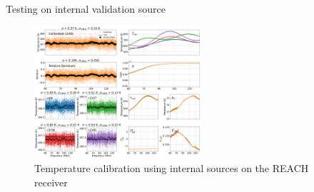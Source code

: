 \documentclass[aspectratio=169]{beamer}
\begin{document}
%

\begin{frame}{\small{Testing on internal validation source}}
    \begin{figure}
        \centering
        \includegraphics[width=0.55\textwidth]{images/temps.png}
        \caption{Temperature calibration using internal sources on the REACH 
        receiver}
    \end{figure}
\end{frame}

\end{document}
